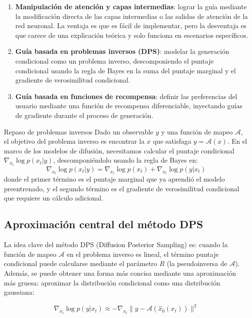 \documentclass[a4paper]{article}
\begin{document}
\begin{enumerate}
    \item \textbf{Manipulación de atención y capas intermedias}: lograr la guía mediante la modificación directa de las capas intermedias o las salidas de atención de la red neuronal. La ventaja es que es fácil de implementar, pero la desventaja es que carece de una explicación teórica y solo funciona en escenarios específicos.
    \item \textbf{Guía basada en problemas inversos (DPS)}: modelar la generación condicional como un problema inverso, descomponiendo el puntaje condicional usando la regla de Bayes en la suma del puntaje marginal y el gradiente de verosimilitud condicional.
    \item \textbf{Guía basada en funciones de recompensa}: definir las preferencias del usuario mediante una función de recompensa diferenciable, inyectando guías de gradiente durante el proceso de generación.
\end{enumerate}

\begin{importantbox}{Repaso de problemas inversos}
Dado un observable $y$ y una función de mapeo $\mathcal{A}$, el objetivo del problema inverso es encontrar la $x$ que satisfaga $y = \mathcal{A}(x)$. En el marco de los modelos de difusión, necesitamos calcular el puntaje condicional $\nabla_{x_t} \log p(x_t | y)$, descomponiéndolo usando la regla de Bayes en:
$$\nabla_{x_t} \log p(x_t | y) = \nabla_{x_t} \log p(x_t) + \nabla_{x_t} \log p(y | x_t)$$
donde el primer término es el puntaje marginal que ya aprendió el modelo preentrenado, y el segundo término es el gradiente de verosimilitud condicional que requiere un cálculo adicional.
\end{importantbox}

\subsection{Aproximación central del método DPS}

La idea clave del método DPS (Diffusion Posterior Sampling) es: cuando la función de mapeo $\mathcal{A}$ en el problema inverso es lineal, el término puntaje condicional puede calcularse mediante el parámetro $R$ (la pseudoinversa de $\mathcal{A}$). Además, se puede obtener una forma más concisa mediante una aproximación más gruesa: aproximar la distribución condicional como una distribución gaussiana:

$$\nabla_{x_t} \log p(y | x_t) \approx -\nabla_{x_t} \| y - \mathcal{A}(\hat{x}_0(x_t)) \|^2$$
\end{document}
